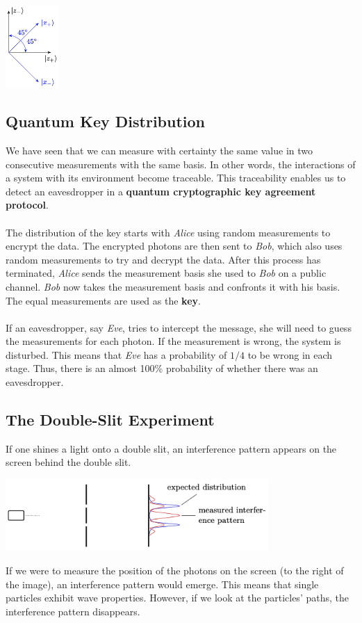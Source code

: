 \documentclass{article}
\begin{document}
\begin{center}
	\includegraphics[width=2cm]{quantum_jump.png}
\end{center}

\subsection{Quantum Key Distribution}
We have seen that we can measure with certainty the same value in two consecutive measurements with the same basis. In other words, the interactions of a system with its environment become traceable. This traceability enables us to detect an eavesdropper in a \textbf{quantum cryptographic key agreement protocol}. \\ \\
The distribution of the key starts with \textit{Alice} using random measurements to encrypt the data. The encrypted photons are then sent to \textit{Bob}, which also uses random measurements to try and decrypt the data. After this process has terminated, \textit{Alice} sends the measurement basis she used to \textit{Bob} on a public channel. \textit{Bob} now takes the measurement basis and confronts it with his basis. The equal measurements are used as the \textbf{key}. \\ \\
If an eavesdropper, say \textit{Eve}, tries to intercept the message, she will need to guess the measurements for each photon. If the measurement is wrong, the system is disturbed. This means that \textit{Eve} has a probability of $1/4$ to be wrong in each stage. Thus, there is an almost 100\% probability of whether there was an eavesdropper.

\subsection{The Double-Slit Experiment}
If one shines a light onto a double slit, an interference pattern appears on the screen behind the double slit.

\begin{center}
	\includegraphics[width=10cm]{assets/double_slit.png}
\end{center}
If we were to measure the position of the photons on the screen (to the right of the image), an interference pattern would emerge. This means that single particles exhibit wave properties. However, if we look at the particles' paths, the interference pattern disappears.
\end{document}
